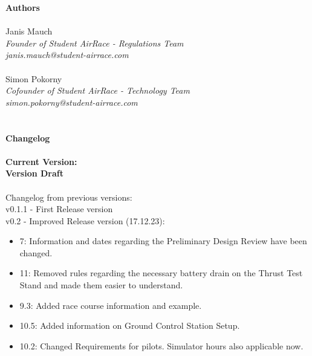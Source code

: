 
\newpage
{\bf Authors}
\\ \\Janis Mauch \emph{\\Founder of Student AirRace - Regulations Team \\janis.mauch@student-airrace.com}
\\ \\ Simon Pokorny \emph{\\Cofounder of Student AirRace - Technology Team \\simon.pokorny@student-airrace.com}
\\ \\ \\
{\bf Changelog}
\\ \\{\bf Current Version: \\Version Draft \getVersion{}}
\\ \\Changelog from previous versions: 
\\ v0.1.1 - First Release version
\\ v0.2 - Improved Release version (17.12.23): 
\begin{itemize}
  \item 7: Information and dates regarding the Preliminary Design Review have been changed. 
  \item 11: Removed rules regarding the necessary battery drain on the Thrust Test Stand and made them easier to understand.
  \item 9.3: Added race course information and example.
  \item 10.5: Added information on Ground Control Station Setup.
  \item 10.2: Changed Requirements for pilots. Simulator hours also applicable now.
\end{itemize}

